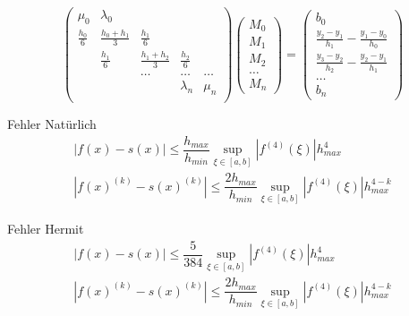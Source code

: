 \documentclass[
	ngerman,
	accentcolor=9c,%
	type=intern,
	marginpar=false
	]{tudapub}
\begin{document}
            \begin{equation*}
                \begin{pmatrix}
                    \mu_0 & \lambda_0 \\
                    \frac{h_0}{6} & \frac{h_0 + h_1}{3} & \frac{h_1}{6}\\
                    & \frac{h_1}{6} & \frac{h_1 + h_2}{3} & \frac{h_2}{6}\\
                    & & \dots & \dots & \dots \\
                    & &  & \lambda_n & \mu_n\\
                \end{pmatrix}
                \begin{pmatrix}
                    M_0\\
                    M_1\\
                    M_2\\
                    \dots\\
                    M_n
                \end{pmatrix}
                =\begin{pmatrix}
                    b_0\\
                    \frac{y_2 - y_1}{h_1} - \frac{y_1-y_0}{h_0}\\
                    \frac{y_3 - y_2}{h_2} - \frac{y_2-y_1}{h_1}\\
                    \dots\\
                    b_n
                \end{pmatrix}
            \end{equation*}
            \newpage
            \setcounter{satz}{5}
            \begin{satz}{Fehler Natürlich}
                \begin{align*}
                    |f(x) - s(x)| \leq \dfrac{h_{max}}{h_{min}} \sup_{\xi\in [a,b]} |f^{(4)}(\xi)| h^4_{max}\\
                    |f(x)^{(k)} - s(x)^{(k)}| \leq \dfrac{2h_{max}}{h_{min}} \sup_{\xi\in [a,b]} |f^{(4)}(\xi)| h^{4-k}_{max}
                \end{align*}
            \end{satz}
            \begin{satz}{Fehler Hermit}
                \begin{align*}
                    |f(x) - s(x)| \leq \dfrac{5}{384} \sup_{\xi\in [a,b]} |f^{(4)}(\xi)| h^4_{max}\\
                    |f(x)^{(k)} - s(x)^{(k)}| \leq \dfrac{2h_{max}}{h_{min}} \sup_{\xi\in [a,b]} |f^{(4)}(\xi)| h^{4-k}_{max}
                \end{align*}
            \end{satz}
            \newpage
\end{document}
